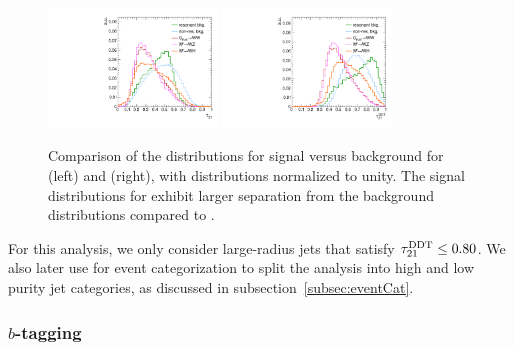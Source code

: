 \begin{figure}[htbp]
  \centering
  \includegraphics[width=0.4\textwidth]{fig/eventSelection/hists_SR_mjet30to210_2017_tau21.pdf}
  \includegraphics[width=0.4\textwidth]{fig/eventSelection/hists_SR_mjet30to210_2017_tau21DDT.pdf}
  \caption{
    Comparison of the distributions for signal versus background for \nsubj (left) and \nsubjDDT (right), with distributions normalized to unity.
    The signal distributions for \nsubjDDT exhibit larger separation from the background distributions compared to \nsubj.
  }
  \label{fig:tau21DDTComp}
\end{figure}

For this analysis, we only consider large-radius jets that satisfy $\tau_{21}^\mathrm{DDT}\leq0.80$.
We also later use \nsubjDDT for event categorization to split the analysis into high and low purity jet categories, as discussed in subsection~\ref{subsec:eventCat}.

\subsubsection{$b$-tagging}


